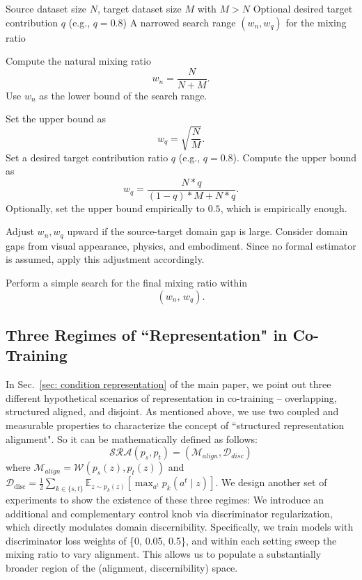 \begin{algorithm}[t]
\caption{Guideline for Co-Training Mixing Ratio Selection}
\label{alg: selection}
\begin{algorithmic}[1]
\REQUIRE Source dataset size $N$, target dataset size $M$ with $M > N$
\REQUIRE Optional desired target contribution $q$ (e.g., $q=0.8$)
\ENSURE A narrowed search range $(w_n, w_q)$ for the mixing ratio

\STATE Compute the natural mixing ratio
\[
w_n = \frac{N}{N+M}.
\]
\STATE Use $w_n$ as the lower bound of the search range.

    \STATE Set the upper bound as
    \[
    w_q = \sqrt{\frac{N}{M}}.
    \]
\ELSE
    \STATE Set a desired target contribution ratio $q$ (e.g., $q=0.8$).
    \STATE Compute the upper bound as
    \[
    w_q = \frac{N*q}{(1-q)*M + N*q}.
    \]
    \STATE Optionally, set the upper bound empirically to $0.5$, which is empirically enough.
\ENDIF

\STATE Adjust $w_n,w_q$ upward if the source-target domain gap is large.
\STATE Consider domain gaps from visual appearance, physics, and embodiment.
\STATE Since no formal estimator is assumed, apply this adjustment accordingly.

\STATE Perform a simple search for the final mixing ratio within
\[
(w_n,\, w_q).
\]

\end{algorithmic}
\end{algorithm}


\subsection{Three Regimes of ``Representation" in Co-Training}
\label{appdx: three regime}

In Sec.~\ref {sec: condition representation} of the main paper, we point out three different hypothetical scenarios of representation in co-training -- overlapping, structured aligned, and disjoint.
As mentioned above, we use two coupled and measurable properties to characterize the concept of ``structured representation alignment". So it can be mathematically defined as follows: $$\mathcal{SRA}(p_s,p_t) = (\mathcal{M}_{align}, \mathcal{D}_{disc})$$
where $\mathcal{M}_{align}=\mathcal{W}(p_s(z),p_t(z))$ and $\mathcal{D}_{\mathrm{disc}} = \frac{1}{2} \sum_{k \in \{s,t\}} \mathbb{E}_{z \sim p_k(z)} \left[ \max_{a^t} p_k(a^t \mid z) \right]$. 
We design another set of experiments to show the existence of these three regimes:
We introduce an additional and complementary control knob via discriminator regularization, which directly modulates domain discernibility. Specifically, we train models with discriminator loss weights of \{0, 0.05, 0.5\}, and within each setting sweep the mixing ratio to vary alignment. This allows us to populate a substantially broader region of the (alignment, discernibility) space.

